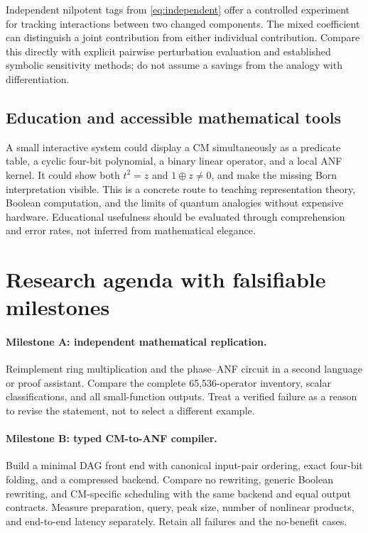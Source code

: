 Independent nilpotent tags from \cref{eq:independent} offer a controlled experiment for tracking interactions between two changed components. The mixed coefficient can distinguish a joint contribution from either individual contribution. Compare this directly with explicit pairwise perturbation evaluation and established symbolic sensitivity methods; do not assume a savings from the analogy with differentiation.

\subsection{Education and accessible mathematical tools}
A small interactive system could display a CM simultaneously as a predicate table, a cyclic four-bit polynomial, a binary linear operator, and a local ANF kernel. It could show both $t^2=z$ and $1\oplus z\ne0$, and make the missing Born interpretation visible. This is a concrete route to teaching representation theory, Boolean computation, and the limits of quantum analogies without expensive hardware. Educational usefulness should be evaluated through comprehension and error rates, not inferred from mathematical elegance.

\section{Research agenda with falsifiable milestones}\label{sec:agenda}
\paragraph{Milestone A: independent mathematical replication.}
Reimplement ring multiplication and the phase--ANF circuit in a second language or proof assistant. Compare the complete 65,536-operator inventory, scalar classifications, and all small-function outputs. Treat a verified failure as a reason to revise the statement, not to select a different example.

\paragraph{Milestone B: typed CM-to-ANF compiler.}
Build a minimal DAG front end with canonical input-pair ordering, exact four-bit folding, and a compressed backend. Compare no rewriting, generic Boolean rewriting, and CM-specific scheduling with the same backend and equal output contracts. Measure preparation, query, peak size, number of nonlinear products, and end-to-end latency separately. Retain all failures and the no-benefit cases.


